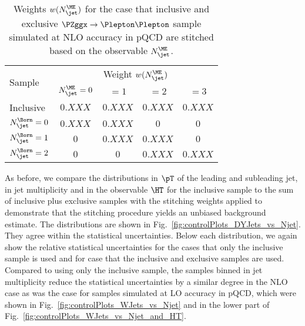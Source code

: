 \begin{table}[h!]
\centering
\begin{tabular}{l|cccc}
\hline
\multirow{2}{20mm}{Sample} & \multicolumn{4}{c}{Weight $w(N_{\jet}^{\ME})$} \\
                           & $N_{\jet}^{\ME} = 0$ & $= 1$   & $= 2$   & $= 3$ \\
\hline
\hline
Inclusive                  & $0.XXX$              & $0.XXX$ & $0.XXX$ & $0.XXX$ \\
\hline
$N_{\jet}^{\Born} = 0$     & $0.XXX$              & $0.XXX$ & $0$     & $0$     \\
$N_{\jet}^{\Born} = 1$     & $0$                  & $0.XXX$ & $0.XXX$ & $0$     \\
$N_{\jet}^{\Born} = 2$     & $0$                  & $0$     & $0.XXX$ & $0.XXX$ \\
\hline
\end{tabular}
\caption{
  Weights $w(N_{\jet}^{\ME})$ for the case that inclusive and exclusive $\PZggx \to \Plepton\Plepton$ sample simulated at NLO accuracy in pQCD
  are stitched based on the observable $N_{\jet}^{\ME}$.
}
\label{tab:weights_DYJets_vs_Njet}
\end{table}

As before, we compare the distributions in $\pT$ of the leading and subleading jet,
in jet multiplicity and in the observable $\HT$ 
for the inclusive sample to the sum of inclusive plus exclusive samples with the stitching weights applied
to demonstrate that the stitching procedure yields an unbiased background estimate.
The distributions are shown in Fig.~\ref{fig:controlPlots_DYJets_vs_Njet}.
They agree within the statistical uncertainties.
Below each distribution, we again show the relative statistical uncertainties for the cases that only the inclusive sample is used
and for case that the inclusive and exclusive samples are used.
Compared to using only the inclusive sample,
the samples binned in jet multiplicity reduce the statistical uncertainties by a similar degree in the NLO case
as was the case for samples simulated at LO accuracy in pQCD, 
which were shown in Fig.~\ref{fig:controlPlots_WJets_vs_Njet} and in the lower part of Fig.~\ref{fig:controlPlots_WJets_vs_Njet_and_HT}.

